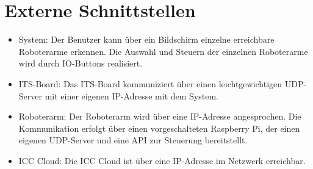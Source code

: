 \section{Externe Schnittstellen}

\begin{itemize}
	\item{System:} Der Benutzer kann über ein Bildschirm einzelne erreichbare Roboterarme erkennen. Die Auswahl und Steuern der einzelnen Roboterarme wird durch IO-Buttons realisiert.
	
   	\item{ITS-Board:} Das ITS-Board kommuniziert über einen leichtgewichtigen UDP-Server mit einer eigenen IP-Adresse mit dem System.

	\item{Roboterarm:} Der Roboterarm wird über eine IP-Adresse angesprochen. Die Kommunikation erfolgt über einen vorgeschalteten Raspberry Pi, der einen eigenen UDP-Server und eine API zur Steuerung bereitstellt.

	\item{ICC Cloud:} Die ICC Cloud ist über eine IP-Adresse im Netzwerk erreichbar. %

	
\end{itemize}